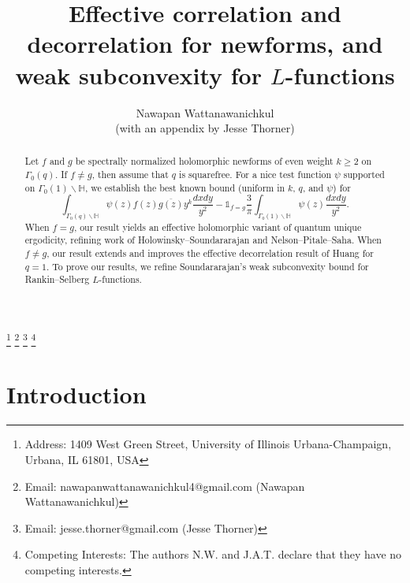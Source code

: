 \documentclass[12pt,reqno]{amsart}
\theoremstyle{remark}
\numberwithin{equation}{section}
\begin{document}
\title[Effective correlation/decorrelation and weak subconvexity]{Effective correlation and decorrelation for newforms, and weak subconvexity for $L$-functions}

\author[Nawapan Wattanawanichkul]{Nawapan Wattanawanichkul \\ (with an appendix by Jesse Thorner)}
\thanks{Address: 1409 West Green Street, University of Illinois Urbana-Champaign, Urbana, IL 61801, USA}
\thanks{Email: nawapanwattanawanichkul4@gmail.com (Nawapan Wattanawanichkul)}
\thanks{Email: jesse.thorner@gmail.com (Jesse Thorner)}
\thanks{Competing Interests: The authors N.W. and J.A.T. declare that they have no competing interests.}

\begin{abstract}
    Let $f$ and $g$ be spectrally normalized holomorphic newforms of even weight $k \geq2$ on $\Gamma_0(q)$. 
    If $f\neq g$, then assume that $q$ is squarefree.  For a nice test function $\psi$ supported on $\Gamma_0(1)\backslash\mathbb{H}$, we establish the best known bound (uniform in $k$, $q$, and $\psi$) for
    \[ 
        \int_{\Gamma_0(q)\backslash\mathbb{H}}\psi(z)f(z)\overline{g(z)}y^{k}\frac{dxdy}{y^2}-\mathds{1}_{f = g}\frac{3}{\pi}\int_{\Gamma_0(1)\backslash\mathbb{H}}\psi(z)\frac{dx dy}{y^2}.
    \]
    When $f=g$, our result yields an effective holomorphic variant of quantum unique ergodicity, refining work of Holowinsky--Soundararajan and Nelson--Pitale--Saha. 
    When $f \neq g$, our result extends and improves the effective decorrelation result of Huang for $q=1$. 
    To prove our results, we refine Soundararajan's weak subconvexity bound for Rankin--Selberg $L$-functions.
\end{abstract}





\maketitle




\vspace{-3mm}

\section{Introduction}
\end{document}
